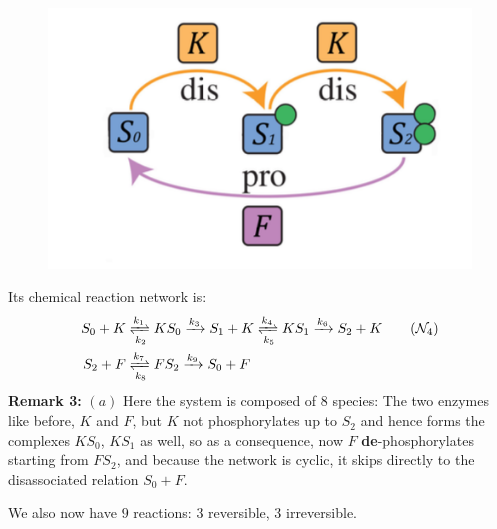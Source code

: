 \begin{figure}[H]
	\includegraphics[width=13cm]{math_pics/ex3-bifurcations.png}
	\centering
\end{figure}
Its chemical reaction network is:
\begin{align}\label{network3}
	S_0+K &\xrightleftharpoons[k_2]{k_1} KS_0 \xrightarrow{k_3} S_1 + K \xrightleftharpoons[k_5]{k_4} KS_1 \xrightarrow{k_6} S_2 + K \tag{$\mathcal{N}_4$}
	\\
	S_2+F &\xrightleftharpoons[k_8]{k_7} FS_2 \xrightarrow{k_9} S_0 + F \notag
\end{align}
\textbf{Remark 3:} $(a)$ Here the system is composed of $8$ species: The two enzymes like before, $K$ and $F$, but $K$ not phosphorylates up to $S_2$ and hence forms the complexes $KS_0$, $KS_1$ as well, so as a consequence, now $F$ \textbf{de}-phosphorylates starting from $FS_2$, and because the network is cyclic, it skips directly to the disassociated relation $S_0 + F$.

We also now have $9$ reactions: $3$ reversible, $3$ irreversible.

